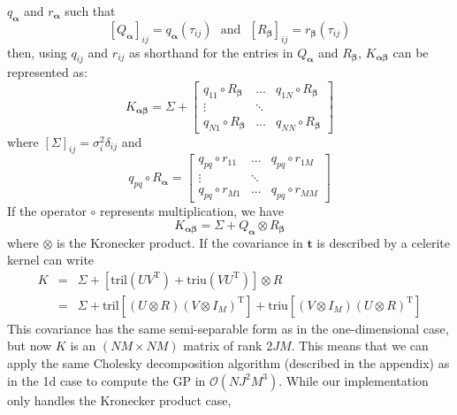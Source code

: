 \documentclass[modern]{aastex62}
\newcommand{\project}[1]{\textsf{#1}}
\newcommand{\celerite}{\project{celerite }}
\newcommand{\bvec}[1]{{\ensuremath{\boldsymbol{#1}}}}
\newcommand{\T}{\ensuremath{\mathrm{T}}}
\begin{document}
	$q_\bvec{\alpha}$ and $r_\bvec{\alpha}$ such that
	\begin{equation}
		\left[Q_\bvec{\alpha}\right]_{ij} = q_\bvec{\alpha}(\tau_{ij})\ \ \ \mathrm{and}\ \ \ \left[R_\bvec{\beta}\right]_{ij} = r_\bvec{\beta}(\tau_{ij})
	\end{equation} 
	then, using $q_{ij}$ and $r_{ij}$ as shorthand for the entries in $Q_\bvec{\alpha}$ and $R_\bvec{\beta}$, $K_\bvec{\alpha\beta}$ can be represented as: 
	\begin{equation}
		K_\bvec{\alpha\beta} = \Sigma + 
			\begin{bmatrix}
				q_{11}\circ R_\bvec{\beta} & ... & q_{1N}\circ R_\bvec{\beta} \\
				\vdots & \ddots & \\
				q_{N1}\circ R_\bvec{\beta} & ... & q_{NN}\circ R_\bvec{\beta}
			\end{bmatrix}
	\end{equation}
	where $[\Sigma]_{ij} = \sigma_i^2\delta_{ij}$ and
	\begin{equation}
		q_{pq}\circ R_\bvec{\alpha} = 
			\begin{bmatrix}
				q_{pq}\circ r_{11} & ... & q_{pq}\circ r_{1M} \\
				\vdots & \ddots & \\
				q_{pq}\circ r_{M1} & ... & q_{pq}\circ r_{MM}
			\end{bmatrix}
	\end{equation}
	If the operator $\circ$ represents multiplication, we have 
	\begin{equation}
		K_\bvec{\alpha\beta} = \Sigma + Q_\bvec{\alpha} \otimes  R_\bvec{\beta}
	\end{equation}
	where $\otimes$ is the Kronecker product. If the covariance in $\bvec{t}$ is described by a \celerite kernel can write 
	\begin{eqnarray}
		K &=& \Sigma + \left[\mathrm{tril}(UV^\T) + \mathrm{triu}(VU^\T)\right]\otimes R \\
		&=& \Sigma + \mathrm{tril}\left[ (U\otimes R)(V\otimes I_M)^\T\right] + \mathrm{triu}\left[ (V\otimes I_M)(U\otimes R)^\T\right]
	\end{eqnarray}
	This covariance has the same semi-separable form as in the one-dimensional case, but now $K$ is an $(NM\times NM)$ matrix of rank $2JM$. 
	This means that we can apply the same Cholesky decomposition algorithm (described in the appendix) as in the 1d case to compute the GP in 
	$\mathcal{O}(NJ^2M^3)$. While our implementation only handles the Kronecker product case, 
\end{document}
